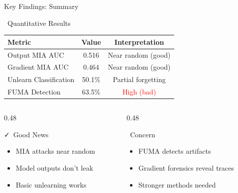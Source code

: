 \documentclass[aspectratio=169, 11pt]{beamer}
\begin{document}
\begin{frame}{Key Findings: Summary}
    \begin{block}{\faChartBar\ Quantitative Results}
        \begin{table}
            \small
            \begin{tabular}{l c c}
                \textbf{Metric} & \textbf{Value} & \textbf{Interpretation} \\
                \hline
                Output MIA AUC & 0.516 & Near random (good) \\
                Gradient MIA AUC & 0.464 & Near random (good) \\
                Unlearn Classification & 50.1\% & Partial forgetting \\
                FUMA Detection & 63.5\% & \textcolor{red}{High (bad)} \\
            \end{tabular}
        \end{table}
    \end{block}
    
    \vspace{0.3em}
    \begin{columns}[T]
        \begin{column}{0.48\textwidth}
            \begin{exampleblock}{\faCheck\ Good News}
                \begin{itemize}
                    \item MIA attacks near random
                    \item Model outputs don't leak
                    \item Basic unlearning works
                \end{itemize}
            \end{exampleblock}
        \end{column}
        \begin{column}{0.48\textwidth}
            \begin{alertblock}{\faExclamationTriangle\ Concern}
                \begin{itemize}
                    \item FUMA detects artifacts
                    \item Gradient forensics reveal traces
                    \item Stronger methods needed
                \end{itemize}
            \end{alertblock}
        \end{column}
    \end{columns}
\end{frame}
\end{document}
